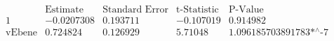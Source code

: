 \[\begin{array}{l|llll}
 \text{} & \text{Estimate} & \text{Standard Error} & \text{t-Statistic} & \text{P-Value} \\
\hline
 1 & -0.0207308 & 0.193711 & -0.107019 & 0.914982 \\
 \text{vEbene} & 0.724824 & 0.126929 & 5.71048 & \text{1.096185703891783$\grave{ }$*${}^{\wedge}$-7} \\
\end{array}\]

